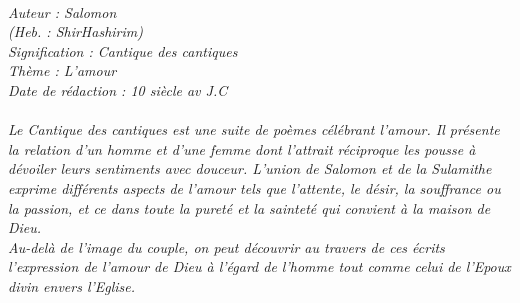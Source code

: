 \BFont
\noindent\hrulefill
{\footnotesize
\textit{
\bigskip
{\centering{}
\\Auteur : Salomon
\\(Heb. : ShirHashirim)
\\Signification : Cantique des cantiques
\\Thème : L'amour
\\Date de rédaction : 10 siècle av J.C\\}
}
\textit{
\\Le Cantique des cantiques est une suite de poèmes célébrant l'amour. Il présente la relation d'un homme et d'une femme dont l'attrait réciproque les pousse à dévoiler leurs sentiments avec douceur. L'union de Salomon et de la Sulamithe exprime différents aspects de l'amour tels que l'attente, le désir, la souffrance ou la passion, et ce dans toute la pureté et la sainteté qui convient à la maison de Dieu.
\\Au-delà de l'image du couple, on peut découvrir au travers de ces écrits l'expression de l'amour de Dieu à l'égard de
l'homme tout comme celui de l'Epoux divin envers l'Eglise.
\bigskip
}
}
\par\nobreak\noindent\hrulefill
